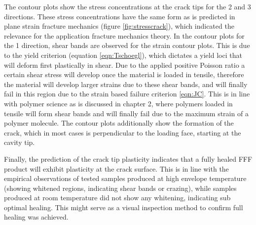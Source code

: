 The contour plots show the stress concentrations at the crack tips for the 2 and 3 directions. These stress concentrations have the same form as is predicted in plane strain fracture mechanics (figure \ref{fig:stresscrack}), which indicated the relevance for the application fracture mechanics theory. In the contour plots for the 1 direction, shear bands are observed for the strain contour plots. This is due to the yield criterion (equation \ref{eqn:Tschoegl}), which dictates a yield loci that will deform first plastically in shear. Due to the applied positive Poisson ratio a certain shear stress will develop once the material is loaded in tensile, therefore the material will develop larger strains due to these shear bands, and will finally fail in this region due to the strain based failure criterion \ref{eqn:JC}. This is in line with polymer science as is discussed in chapter 2, where polymers loaded in tensile will form shear bands and will finally fail due to the maximum strain of a polymer molecule. The contour plots additionally show the formation of the crack, which in most cases is perpendicular to the loading face, starting at the cavity tip. 

Finally, the prediction of the crack tip plasticity indicates that a fully healed FFF product will exhibit plasticity at the crack surface. This is in line with the empirical observations of tested samples produced at high envelope temperature (showing whitened regions, indicating shear bands or crazing), while samples produced at room temperature did not show any whitening, indicating sub optimal healing. This might serve as a visual inspection method to confirm full healing was achieved. 
%


